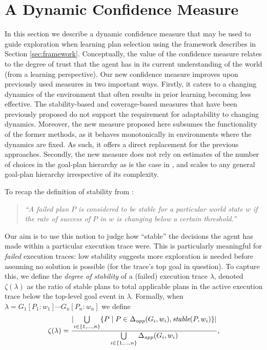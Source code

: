 \section{A Dynamic Confidence Measure}\label{sec:confidence}

In this section we describe a dynamic confidence measure that may be used to guide exploration when learning plan selection using the framework describes in Section \ref{sec:framework}. Conceptually, the value of the confidence measure relates to the degree of trust that the agent has in its current understanding of the world (from a learning perspective). Our new confidence measure improves upon previously used measures in two important ways. 
%
Firstly, it caters to a changing dynamics of the environment that often results in prior learning becoming less effective. The stability-based \cite{airiau09:enhancing} and coverage-based \cite{singh10:extending,singh10:learning} measures that have been previously proposed do not support the requirement for adaptability to changing dynamics. Moreover, the new measure proposed here subsumes the functionality of the former methods, as it behaves monotonically in environments where the dynamics are fixed. As such, it offers a direct replacement for the previous approaches. 
%
Secondly, the new measure does not rely on estimates of the number of choices in the goal-plan hierarchy as is the case in \cite{singh10:extending,singh10:learning}, and scales to any general goal-plan hierarchy irrespective of its complexity.


To recap the definition of stability from \cite{singh10:learning}:

\begin{quote}
\emph{``A failed plan $P$ is considered to be stable for a particular world state $w$ if the rate of success of $P$ in $w$ is changing below a certain threshold.''}
\end{quote} 

\newcommand{\ds}{\zeta}
\newcommand{\app}{\mathname{app}}
\newcommand{\stable}{\mathname{stable}}

Our aim is to use this notion to judge how ``stable'' the decisions the agent has made within a particular execution trace were. This is particularly meaningful for \emph{failed} execution traces: low stability suggests more exploration is needed before assuming no solution is possible (for the trace's top goal in question).
To capture this, we define the \emph{degree of stability} of a (failed) execution trace $\lambda$, denoted $\ds(\lambda)$ as the ratio of stable plans to total applicable plans in the active execution trace below the top-level goal event in $\lambda$. Formally, when $\lambda= G_1[P_1:w_1] \cdots G_n[P_n:w_n]$ we define 
\[
\ds(\lambda) = 
	\frac{ 
			\card{ \bigcup\limits_{i \in \{1,\ldots,n\}} 
						\set{P \mid P \in \Delta_{\app}(G_i,w_i), \stable(P,w_i)} } 
		}
		{
			\bigcup\limits_{i \in \{1,\ldots,n\}} \Delta_{\app}(G_i,w_i) 
		},
\]

